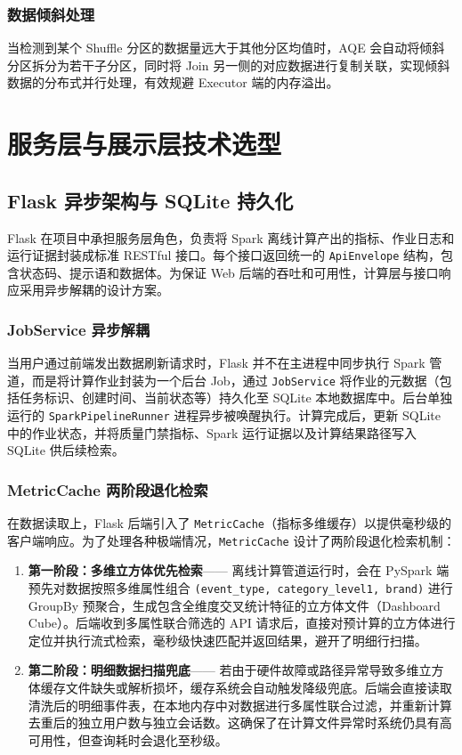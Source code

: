 \subsubsection{数据倾斜处理}

当检测到某个 Shuffle 分区的数据量远大于其他分区均值时，AQE 会自动将倾斜分区拆分为若干子分区，同时将 Join 另一侧的对应数据进行复制关联，实现倾斜数据的分布式并行处理，有效规避 Executor 端的内存溢出。

\section{服务层与展示层技术选型}

\subsection{Flask 异步架构与 SQLite 持久化}

Flask 在项目中承担服务层角色，负责将 Spark 离线计算产出的指标、作业日志和运行证据封装成标准 RESTful 接口。每个接口返回统一的 \texttt{ApiEnvelope} 结构，包含状态码、提示语和数据体。为保证 Web 后端的吞吐和可用性，计算层与接口响应采用异步解耦的设计方案。

\subsubsection{JobService 异步解耦}

当用户通过前端发出数据刷新请求时，Flask 并不在主进程中同步执行 Spark 管道，而是将计算作业封装为一个后台 Job，通过 \texttt{JobService} 将作业的元数据（包括任务标识、创建时间、当前状态等）持久化至 SQLite 本地数据库中。后台单独运行的 \texttt{SparkPipelineRunner} 进程异步被唤醒执行。计算完成后，更新 SQLite 中的作业状态，并将质量门禁指标、Spark 运行证据以及计算结果路径写入 SQLite 供后续检索。

\subsubsection{MetricCache 两阶段退化检索}

在数据读取上，Flask 后端引入了 \texttt{MetricCache}（指标多维缓存）以提供毫秒级的客户端响应。为了处理各种极端情况，\texttt{MetricCache} 设计了两阶段退化检索机制：
\begin{enumerate}
  \item \textbf{第一阶段：多维立方体优先检索}——
        离线计算管道运行时，会在 PySpark 端预先对数据按照多维属性组合 \texttt{(event\_type, category\_level1, brand)} 进行 GroupBy 预聚合，生成包含全维度交叉统计特征的立方体文件（Dashboard Cube）。后端收到多属性联合筛选的 API 请求后，直接对预计算的立方体进行定位并执行流式检索，毫秒级快速匹配并返回结果，避开了明细行扫描。
  \item \textbf{第二阶段：明细数据扫描兜底}——
        若由于硬件故障或路径异常导致多维立方体缓存文件缺失或解析损坏，缓存系统会自动触发降级兜底。后端会直接读取清洗后的明细事件表，在本地内存中对数据进行多属性联合过滤，并重新计算去重后的独立用户数与独立会话数。这确保了在计算文件异常时系统仍具有高可用性，但查询耗时会退化至秒级。
\end{enumerate}

